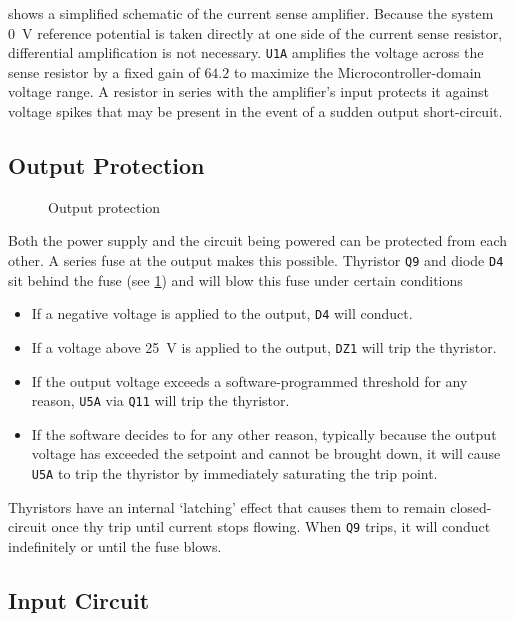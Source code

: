 \documentclass[a4paper,twocolumn,10pt,openany,oneside,final,fleqn]{memoir}
\newcommand{\rd}[1]{\texttt{#1}}
\newcommand{\xcircuit}[1]{ \centering \textsf{  } }
\begin{document}
 shows a simplified schematic of the current sense amplifier.
Because the system \SI{0}{V} reference potential is taken directly at one side of the
current sense resistor, differential amplification is not necessary. \rd{U1A} amplifies
the voltage across the sense resistor by a fixed gain of $64.2$ to maximize the
Microcontroller-domain voltage range. A resistor in series with the amplifier's
input protects it against voltage spikes that may be present in the event of a sudden
output short-circuit.

\subsection{Output Protection}

\begin{figure}
\xcircuit{outputprot}
\caption{Output protection}
\label{fig:outputprot}
\end{figure}

Both the power supply and the circuit being powered can be protected from each other.
A series fuse at the output makes this possible. Thyristor \rd{Q9} and diode \rd{D4}
sit behind the fuse (see \cref{fig:outputprot}) and
will blow this fuse under certain conditions

\begin{itemize}
    \item{If a negative voltage is applied to the output, \rd{D4} will conduct.}
    \item{If a voltage above \SI{25}{V} is applied to the output, \rd{DZ1} will
        trip the thyristor.}
    \item{If the output voltage exceeds a software-programmed threshold for any
        reason, \rd{U5A} via \rd{Q11} will trip the thyristor.}
    \item{If the software decides to for any other reason, typically because the
        output voltage has exceeded the setpoint and cannot be brought down,
        it will cause \rd{U5A} to trip the thyristor by immediately saturating
        the trip point.}
\end{itemize}

Thyristors have an internal `latching' effect that causes them to remain closed-circuit
once thy trip until current stops flowing. When \rd{Q9} trips, it will conduct indefinitely
or until the fuse blows.

\subsection{Input Circuit}
\end{document}
